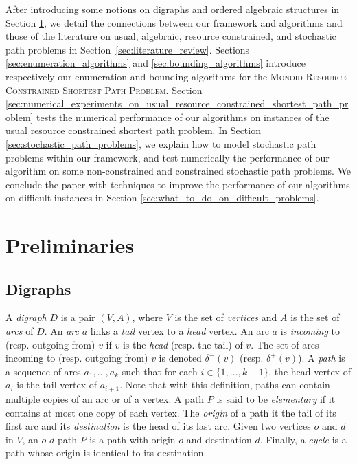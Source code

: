 \documentclass[11pt]{amsart}
\theoremstyle{plain}
\theoremstyle{remark}
\newcommand{\MRCSP}{\textsc{Monoid Resource Constrained Shortest Path Problem}\xspace}
\begin{document}
After introducing some notions on digraphs and ordered algebraic structures in Section \ref{sec:preliminaries}, we detail the connections between our framework and algorithms and those of the literature on usual, algebraic, resource constrained, and stochastic path problems in Section~\ref{sec:literature_review}. Sections \ref{sec:enumeration_algorithms} and \ref{sec:bounding_algorithms} introduce respectively our enumeration and bounding algorithms for the \MRCSP. Section \ref{sec:numerical_experiments_on_usual_resource_constrained_shortest_path_problem} tests the numerical performance of our algorithms on instances of the usual resource constrained shortest path problem. In Section \ref{sec:stochastic_path_problems}, we explain how to model stochastic path problems within our framework, and test numerically the performance of our algorithm on some non-constrained and constrained stochastic path problems. We conclude the paper with techniques to improve the performance of our algorithms on difficult instances in Section \ref{sec:what_to_do_on_difficult_problems}.

\section{Preliminaries} \label{sec:preliminaries}

\subsection{Digraphs} \label{sub:digraphs}

A \emph{digraph} $D$ is a pair $(V,A)$, where $V$ is the set of \emph{vertices} and $A$ is the set of \emph{arcs} of $D$. An \emph{arc} $a$ links a \emph{tail} vertex to a \emph{head} vertex. An arc $a$ is \emph{incoming} to (resp. outgoing from) $v$ if $v$ is the \emph{head} (resp. the tail) of $v$. The set of arcs incoming to (resp. outgoing from) $v$ is denoted $\delta^{-}(v)$ (resp. $\delta^{+}(v)$).  A \emph{path} is a sequence of arcs $a_{1},\ldots,a_{k}$ such that for each $i \in \{1,\ldots,k-1\}$, the head vertex of $a_{i}$ is the  tail vertex of $a_{i+1}$. Note that with this definition, paths can contain multiple copies of an arc or of a vertex. A path $P$ is said to be \emph{elementary} if it contains at most one copy of each vertex. The \emph{origin} of a path it the tail of its first arc and its \emph{destination} is the head of its last arc. Given two vertices $o$ and $d$ in $V$, an $o$-$d$ path $P$ is a path with origin $o$ and destination $d$. Finally, a \emph{cycle} is a path whose origin is identical to its destination.
\end{document}
